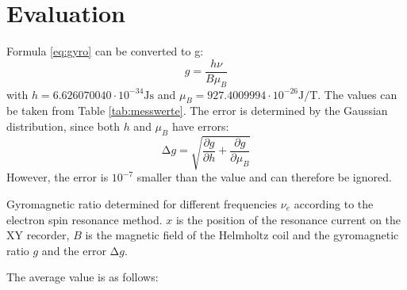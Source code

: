 \section{Evaluation}
Formula \ref{eq:gyro} can be converted to g:
\begin{equation}
  g=\frac{h\nu}{B\mu_{B}}
\end{equation}
with $h=6.626070040\cdot10^{-34}\si{\joule\second}$ and $\mu_B=927.4009994\cdot10^{-26}\si{\joule\per\tesla}$.
The values can be taken from Table \ref{tab:messwerte}.
The error is determined by the Gaussian distribution, since both $h$ and $\mu_B$ have errors:
\begin{equation}
  \increment g = \sqrt{\frac{\partial g}{\partial h}+\frac{\partial g}{\partial \mu_B}}
\end{equation}
However, the error is $10^{-7}$ smaller than the value and can therefore be ignored.
\begin{table}
  \centering
  \caption{Gyromagnetic ratio determined for different frequencies $\nu_e$ according to the electron spin resonance method.
  $x$ is the position of the resonance current on the XY recorder,
  $B$ is the magnetic field of the Helmholtz coil and the gyromagnetic ratio $g$ and the error $\increment g$.}
  \label{tab:messwerte}
\end{table}
The average value is as follows:
